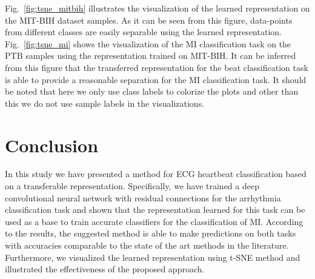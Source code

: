 \documentclass[10pt, conference, compsocconf]{IEEEtran}
\begin{document}
Fig.~\ref{fig:tsne_mitbih} illustrates the visualization of the learned representation on the MIT-BIH dataset samples. As it can be seen from this figure, data-points from different classes are easily separable using the learned representation. Fig.~\ref{fig:tsne_mi} shows the visualization of the MI classification task on the PTB samples using the representation trained on MIT-BIH. It can be inferred from this figure that the transferred representation for the beat classification task is able to provide a reasonable separation for the MI classification task. It should be noted that here we only use class labels to colorize the plots and other than this we do not use sample labels in the visualizations.





\section{Conclusion}
\label{sec:Conclusion}
In this study we have presented a method for ECG heartbeat classification based on a transferable representation. Specifically, we have trained a deep convolutional neural network with residual connections for the arrhythmia classification task and shown that the representation learned for this task can be used as a base to train accurate classifiers for the classification of MI. According to the results, the suggested method is able to make predictions on both tasks with accuracies comparable to the state of the art methods in the literature. Furthermore, we visualized the learned representation using t-SNE method and illustrated the effectiveness of the proposed approach. 
\end{document}
